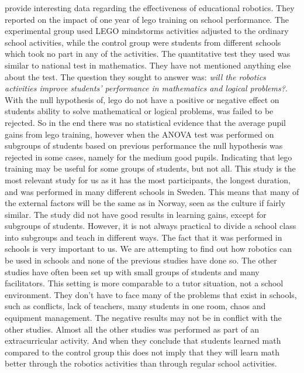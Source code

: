 \bigskip\noindent
{} provide interesting data regarding the effectiveness of educational robotics. They reported on the impact of one year of lego training on school performance. The experimental group used LEGO mindstorms activities adjusted to the ordinary school activities, while the control group were students from different schools which took no part in any of the activities. The quantitative test they used was similar to national test in mathematics. They have not mentioned anything else about the test. The question they sought to answer was: \textit{will the robotics activities improve students' performance in mathematics and logical problems?}. With the null hypothesis of, lego do not have a positive or negative effect on students ability to solve mathematical or logical problems, was failed to be rejected. So in the end there was no statistical evidence that the average pupil gains from lego training, however when the ANOVA test was performed on subgroups of students based on previous performance the null hypothesis was rejected in some cases, namely for the medium good pupils. Indicating that lego training may be useful for some groups of students, but not all. This study is the most relevant study for us as it has the most participants, the longest duration, and was performed in many different schools in Sweden. This means that many of the external factors will be the same as in Norway, seen as the culture if fairly similar. The study did not have good results in learning gains, except for subgroups of students. However, it is not always practical to divide a school class into subgroups and teach in different ways. The fact that it was performed in schools is very important to us. We are attempting to find out how robotics can be used in schools and none of the previous studies have done so. The other studies have often been set up with small groups of students and many facilitators. This setting is more comparable to a tutor situation, not a school environment. They don't have to face many of the problems that exist in schools, such as conflicts, lack of teachers, many students in one room, chaos and equipment management. The negative results may not be in conflict with the other studies. Almost all the other studies was performed as part of an extracurricular activity. And when they conclude that students learned math compared to the control group this does not imply that they will learn math better through the robotics activities than through regular school activities. \cite{lindh2007does}

